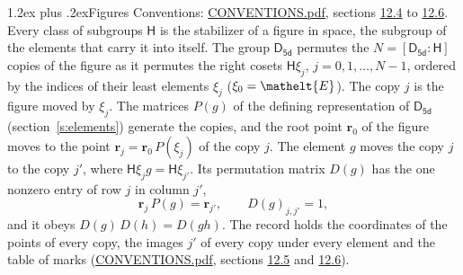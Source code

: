 \documentclass[10pt,a4paper]{article}
\makeatletter
\renewcommand\section{\@startsection{section}{1}{\z@}{-3ex plus -1ex minus -.2ex}%
  {1.2ex plus .2ex}{\normalfont\large\sffamily\bfseries\color{parttitle}}}
\numberwithin{equation}{section}
\newcommand{\eltfont}[1]{{\let\sigma\eltsigma\mathelt{#1}}}
\newcommand{\grp}[1]{\mathsf{#1}}
\newcommand{\cls}[1]{\eltfont{#1}}
\newcommand{\pointr}{\mathbf{r}}
\makeatother
\begin{document}
\section{Figures}\label{s:permutation}
Conventions: \href{../../CONVENTIONS.pdf}{CONVENTIONS.pdf}, sections \href{../../CONVENTIONS.pdf\#conv.12.4}{12.4} to \href{../../CONVENTIONS.pdf\#conv.12.6}{12.6}.
Every class of subgroups $\grp{H}$ is the stabilizer of a figure in space, the subgroup of the elements that carry it into itself. \label{n:local.orbit.size}\label{n:element.coset.least}\label{n:index.coset}The group $\grp{D_{5d}}$ permutes the $N = [\grp{D_{5d}} : \grp{H}]$ copies of the figure as it permutes the right cosets $\grp{H}\xi_j$, $j = 0, 1, \dots, N - 1$, ordered by the indices of their least elements $\xi_j$ ($\xi_0 = \cls{E}$). The copy $j$ is the figure moved by $\xi_j$. The matrices $P(g)$ of the defining representation of $\grp{D_{5d}}$ (section~\ref{s:elements}) generate the copies, and the root point $\pointr_0$ of the figure moves to the point $\pointr_j = \pointr_0\, P(\xi_j)$ of the copy $j$. \label{n:local.coset.image}The element $g$ moves the copy $j$ to the copy $j'$, where $\grp{H}\xi_j g = \grp{H}\xi_{j'}$. \label{n:local.matrix.permutation}Its permutation matrix $D(g)$ has the one nonzero entry of row $j$ in column $j'$,
\begin{equation}\label{e:perm.matrix}\pointr_j\, P(g) = \pointr_{j'}, \qquad D(g)_{j,j'} = 1,\end{equation}
and it obeys $D(g)\, D(h) = D(gh)$. The record holds the coordinates of the points of every copy, the images $j'$ of every copy under every element and the table of marks (\href{../../CONVENTIONS.pdf}{CONVENTIONS.pdf}, sections \href{../../CONVENTIONS.pdf\#conv.12.5}{12.5} and \href{../../CONVENTIONS.pdf\#conv.12.6}{12.6}).
\end{document}
